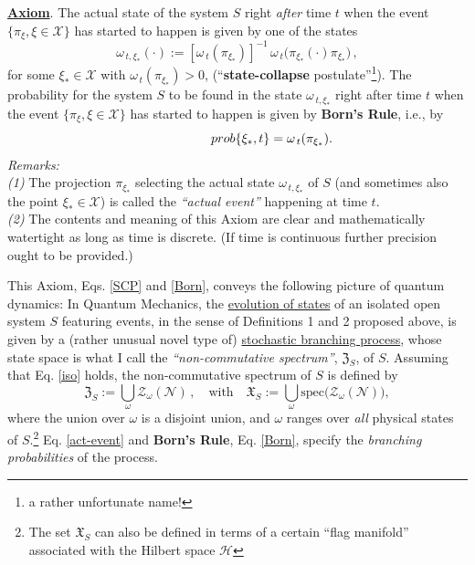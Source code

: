 \documentclass[a4paper,11pt]{article}
\begin{document}
\begin{enumerate}
{\underline{\bf{Axiom}}. The actual state of the system $S$ right \textit{after} time $t$ when the event $\lbrace \pi_{\xi}, \xi \in \mathcal{X} \rbrace$ has started to happen is given by one of the states
\begin{equation}\label{SCP}
\omega_{\,t, \xi_{*}}(\cdot):=[\omega_{\,t}(\pi_{\xi_{*}})]^{-1}\,\omega_{\,t}\big(\pi_{\xi_{*}} (\cdot) \pi_{\xi_{*}}\big)\,,
\end{equation}
for some $\xi_{*} \in \mathcal{X}$ with $\omega_{\,t}(\pi_{\xi_{*}})>0$, (``{\bf{state-collapse}} postulate''\footnote{a rather unfortunate name!}). The probability for the system $S$ to be found in the state $\omega_{\,t,\xi_{*}}$ right after time $t$ when the event 
$\lbrace \pi_{\xi}, \xi \in \mathcal{X} \rbrace$ has started to happen is given by {\bf{Born's Rule}}, i.e., by
\begin{equation}\label{Born}
\hspace{4.1cm}prob\{\xi_{*}, t\} = \omega_{\,t}(\pi_{\xi_{*}}). \hspace{2.2cm} \square
\end{equation}
\textit{Remarks:} \\
\textit{(1)} The projection $\pi_{\xi_{*}}$ selecting the actual state $\omega_{\,t, \xi_{*}}$ of $S$ (and sometimes also the point 
$\xi_{*} \in \mathcal{X}$) is called the \textit{``actual event''} happening at time $t$. \\
\textit{(2)} The contents and meaning of this Axiom are clear and mathematically watertight as long as time is discrete. (If time is continuous further precision ought to be provided.)}
\end{enumerate}
This Axiom, Eqs. \eqref{SCP} and \eqref{Born}, conveys the following picture of quantum dynamics: In Quantum Mechanics, the \underline{evolution of states} of an isolated open system $S$ featuring events, in the sense of Definitions 1 and 2 proposed above, is given by a (rather unusual novel type of) \underline{stochastic branching process}, whose state space is what I call the \textit{``non-commutative spectrum''}, 
$\mathfrak{Z}_{S}$, of $S$. Assuming that Eq. \eqref{iso} holds, the non-commutative spectrum of $S$ is defined by
\begin{equation}\label{NCspect}
\mathfrak{Z}_{S}:= \bigcup_{\omega} \mathcal{Z}_{\omega}(\mathcal{N})\,, \quad \text{with} \quad \mathfrak{X}_{S}:= \bigcup_{\omega} \text{spec}\Big(\mathcal{Z}_{\omega}(\mathcal{N})\Big),
\end{equation}
where the union over $\omega$ is a disjoint union, and $\omega$ ranges over \textit{all} physical states of $S$.\footnote{The set $\mathfrak{X}_{S}$ can also be defined in terms of a certain ``flag manifold'' associated with the Hilbert space $\mathcal{H}$} Eq. \eqref{act-event} and {\bf{Born's Rule}}, Eq. \eqref{Born}, specify the \textit{branching probabilities} of the process.\\
\end{document}
